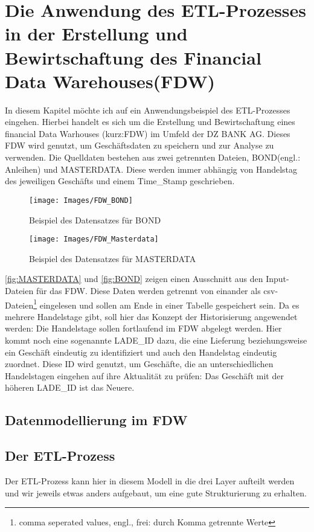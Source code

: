 \chapter{Die Anwendung des ETL-Prozesses in der Erstellung und Bewirtschaftung des Financial Data Warehouses(FDW)}\label{cap:Anwendungsbeispiel}
In diesem Kapitel möchte ich auf ein Anwendungsbeispiel des ETL-Prozesses eingehen. Hierbei handelt es sich um die Erstellung und Bewirtschaftung eines financial Data Warhouses (kurz:FDW) im Umfeld der DZ BANK AG. Dieses FDW wird genutzt, um Geschäftsdaten zu speichern und zur Analyse zu verwenden. Die Quelldaten bestehen aus zwei getrennten Dateien, BOND(engl.: Anleihen) und MASTERDATA. Diese werden immer abhängig von Handelstag des jeweiligen Geschäfts und einem Time\_Stamp geschrieben. 
\begin{figure}[H]
	\begin{center} 
		\texttt{[image: Images/FDW\_BOND]}
		\caption{Beispiel des Datensatzes für BOND\cite{Intern}}
		\label{fig:BOND}
	\end{center}
\end{figure}
\begin{figure}[H]
	\begin{center}
		\texttt{[image: Images/FDW\_Masterdata]}
		\caption{Beispiel des Datensatzes für MASTERDATA\cite{Intern}}
		\label{fig:MASTERDATA}
	\end{center}
\end{figure}

\autoref{fig:MASTERDATA} und \autoref{fig:BOND} zeigen einen Ausschnitt aus den Input-Dateien für das FDW. Diese Daten werden getrennt von einander als csv-Dateien\footnote{comma seperated values, engl., frei: durch Komma getrennte Werte} eingelesen und sollen am Ende in einer Tabelle gespeichert sein. Da es mehrere Handelstage gibt, soll hier das Konzept der Historisierung angewendet werden: Die Handelstage sollen fortlaufend im FDW abgelegt werden. Hier kommt noch eine sogenannte LADE\_ID dazu, die eine Lieferung beziehungsweise ein Geschäft eindeutig zu identifiziert und auch den Handelstag eindeutig zuordnet. Diese ID wird genutzt, um Geschäfte, die an unterschiedlichen Handelstagen eingehen auf ihre Aktualität zu prüfen: Das Geschäft mit der höheren LADE\_ID ist das Neuere.
\section{Datenmodellierung im FDW}
\section{Der ETL-Prozess}\label{sec:ETL_FDW}
Der ETL-Prozess kann hier in diesem Modell in die drei Layer aufteilt werden und wir jeweils etwas anders aufgebaut, um eine gute Strukturierung zu erhalten.
